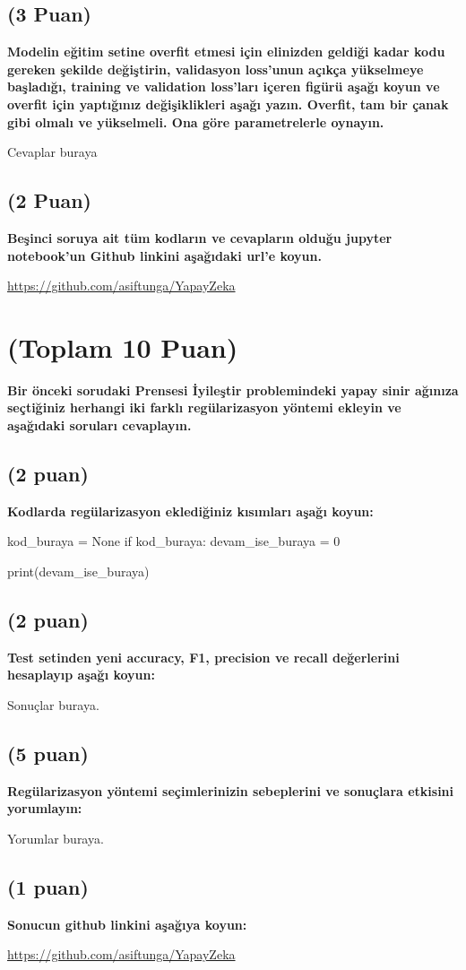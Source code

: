 \documentclass[11pt]{article}
\begin{document}
\subsection{(3 Puan)} \textbf{Modelin eğitim setine overfit etmesi için elinizden geldiği kadar kodu gereken şekilde değiştirin, validasyon loss'unun açıkça yükselmeye başladığı, training ve validation loss'ları içeren figürü aşağı koyun ve overfit için yaptığınız değişiklikleri aşağı yazın. Overfit, tam bir çanak gibi olmalı ve yükselmeli. Ona göre parametrelerle oynayın.}

Cevaplar buraya

\begin{comment}
\begin{figure}[ht!]
    \centering
    \texttt{[image: mypicturehere.png]}
    \caption{Buraya açıklama yazın}
    \label{fig:my_pic}
\end{figure}
\end{comment}

\subsection{(2 Puan)} \textbf{Beşinci soruya ait tüm kodların ve cevapların olduğu jupyter notebook'un Github linkini aşağıdaki url'e koyun.}

\url{https://github.com/asiftunga/YapayZeka}

\section{(Toplam 10 Puan)} \textbf{Bir önceki sorudaki Prensesi İyileştir problemindeki yapay sinir ağınıza seçtiğiniz herhangi iki farklı regülarizasyon yöntemi ekleyin ve aşağıdaki soruları cevaplayın.} 

\subsection{(2 puan)} \textbf{Kodlarda regülarizasyon eklediğiniz kısımları aşağı koyun:} 

\begin{python}
kod_buraya = None
if kod_buraya:
    devam_ise_buraya = 0

print(devam_ise_buraya)
\end{python}

\subsection{(2 puan)} \textbf{Test setinden yeni accuracy, F1, precision ve recall değerlerini hesaplayıp aşağı koyun:}

Sonuçlar buraya.

\subsection{(5 puan)} \textbf{Regülarizasyon yöntemi seçimlerinizin sebeplerini ve sonuçlara etkisini yorumlayın:}

Yorumlar buraya.

\subsection{(1 puan)} \textbf{Sonucun github linkini  aşağıya koyun:}

\url{https://github.com/asiftunga/YapayZeka}
\end{document}
